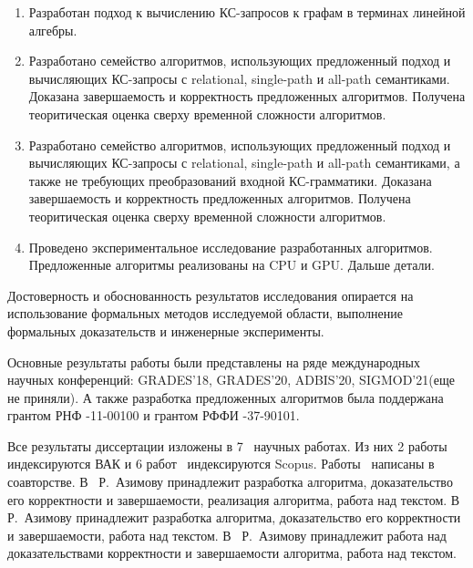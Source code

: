 {}
\begin{enumerate}[beginpenalty=10000] %
	\item Разработан подход к вычислению КС-запросов к графам в терминах линейной алгебры.
	\item Разработано семейство алгоритмов, использующих предложенный подход и вычисляющих КС-запросы с relational, single-path и all-path семантиками. Доказана завершаемость и корректность предложенных алгоритмов. Получена теоритическая оценка сверху временной сложности алгоритмов.
	\item Разработано семейство алгоритмов, использующих предложенный подход и вычисляющих КС-запросы с relational, single-path и all-path семантиками, а также не требующих преобразований входной КС-грамматики. Доказана завершаемость и корректность предложенных алгоритмов. Получена теоритическая оценка сверху временной сложности алгоритмов.
	\item Проведено экспериментальное исследование разработанных алгоритмов. Предложенные алгоритмы реализованы на CPU и GPU. Дальше детали.
\end{enumerate}

{\reliability} 
Достоверность и обоснованность результатов исследования опирается на использование формальных методов исследуемой области, выполнение формальных доказательств и инженерные эксперименты.

Основные результаты работы были представлены на ряде международных научных конференций: GRADES'18, GRADES'20, ADBIS’20, SIGMOD'21(еще не приняли). А также разработка предложенных алгоритмов была поддержана грантом РНФ -11-00100 и грантом РФФИ -37-90101.


{\publications} Все результаты диссертации изложены в 7~\cite{1,2,3,4,5,6,7} научных работах. Из них 2 работы~\cite{6,7} индексируются ВАК и 6 работ~\cite{1,2,3,4,5,6} индексируются Scopus. Работы~\cite{1,2,3,4,6,7} написаны в соавторстве. В~\cite{1,6,7} Р.~Азимову принадлежит разработка алгоритма, доказательство его корректности и завершаемости, реализация алгоритма, работа над текстом. В~\cite{2} Р.~Азимову принадлежит разработка алгоритма, доказательство его корректности и завершаемости, работа над текстом. В~\cite{3,4} Р.~Азимову принадлежит работа над доказательствами корректности и завершаемости алгоритма, работа над текстом.


